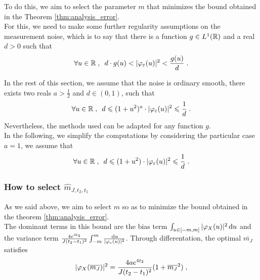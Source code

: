 To do this, we aim to select the parameter $m$ that minimizes the bound obtained in the Theorem \ref{thm:analysis_error}.\\


For this, we need to make some further regularity assumptions on the measurement noise, which is to say that there is a function $g \in L^1(\mathbb{R})$ and a real $d > 0$ such that 
    \begin{equation*}
        \forall u \in \mathbb{R} 
	    \; , \enspace
        d \cdot g(u) < |\varphi_\varepsilon(u)|^2 < \frac{g(u)}{d}
        \; .
    \end{equation*}

In the rest of this section, we assume that the noise is ordinary smooth, \ie there exists two reals $a > \frac{1}{2}$ and $d \in (0, 1)$, such that 
	\begin{equation*}
	\forall u \in \mathbb{R} 
	\; , \enspace
	d \leqslant (1+u^2)^a \cdot |\varphi_\varepsilon(u)|^2 \leqslant \frac{1}{d}
	\; .
	\end{equation*}
Nevertheless, the methods used can be adapted for any function $g$. \\

In the following, we simplify the computations by considering the particular case $a = 1$, \ie we assume that 
 	\begin{equation*}
	\forall u \in \mathbb{R} 
	\; , \enspace
	d \leqslant (1+u^2) \cdot |\varphi_\varepsilon(u)|^2 \leqslant \frac{1}{d}
	\; .
	\end{equation*}
	




\subsubsection*{How to select $\hat m_{J,t_2,t_1}$}

As we said above, we aim to select $m$ so as to minimize the bound obtained in the theorem \ref{thm:analysis_error}. \\

The dominant terms in this bound are the bias term $\int_{u \in [-m, m]} |\varphi_X(u)|^2 \, \mathrm du$ and the variance term $ \frac{4 e^{4t_2}}{J (t_2 - t_1)^2} \int_{-m}^{m} \frac{\, \mathrm du}{|\varphi_{\varepsilon}(u)|^2}$. Through differentation, the optimal $\bar{m_J}$ satisfies
    \begin{equation*}
        |\varphi_X(\overline{m_J})|^2 = \frac{4a  e^{4t_2}}{J (t_2 - t_1)^2} (1 + {\overline{m_J}}^{2})
        \; ,
    \end{equation*}

